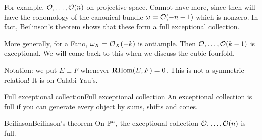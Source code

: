 For example, $\O,\dots,\O(n)$ on projective space. Cannot have more, since then will have the cohomology of the canonical bundle $\omega=\O(-n-1)$ which is nonzero. In fact, Beilinson's theorem shows that these form a full exceptional collection.

More generally, for a Fano, $\omega_{X}=\O_{X}(-k)$ is antiample. Then $\O, \dots, \O(k-1)$ is exceptional. We will come back to this when we discuss the cubic fourfold.


Notation: we put $E \perp F$ whenever $\RHom(E,F)=0$. This is not a symmetric relation! It is on Calabi-Yau's.

\begin{definition}{Full exceptional collection}{Full exceptional collection}
    An exceptional collection is full if you can generate every object by sums, shifts and cones.

\end{definition}

\begin{theorem}{Beilinson}{Beilinson's theorem}
    On $\P^n,$ the exceptional collection $\O,\dots,\O(n)$ is full.
\end{theorem}


